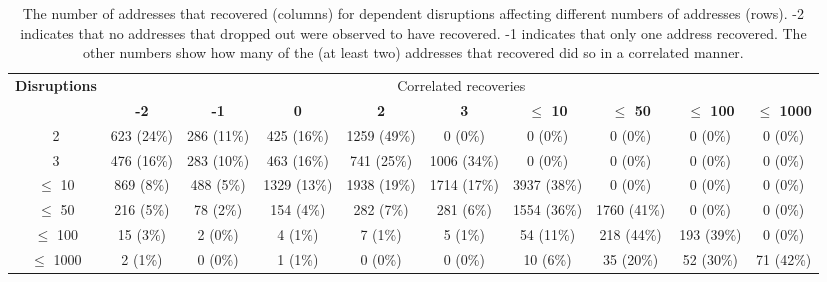\begin{table*}[th]
  \centering
  \hspace{-0.04in}\tiny
  \begin{tabular}{c|c|c|c|c|c|c|c|c|c|}
\textbf{Disruptions} & \multicolumn{9}{c|}{Correlated recoveries} \\
    & \textbf{-2} & \textbf{-1} & \textbf{0} & \textbf{2} &
    \textbf{3} & \textbf{$\leq$ 10}  &
    \textbf{$\leq$ 50}  & \textbf{$\leq$ 100}  & \textbf{$\leq$ 1000}\\
    \hline
2 & 623 (24\%) & 286 (11\%) & 425 (16\%) & 1259 (49\%) & 0 (0\%) & 0 (0\%) & 0 (0\%) & 0 (0\%) & 0 (0\%)\\
3 & 476 (16\%) & 283 (10\%) & 463 (16\%) & 741 (25\%) & 1006 (34\%) & 0 (0\%) & 0 (0\%) & 0 (0\%) & 0 (0\%)\\
$\leq$ 10 & 869 (8\%) & 488 (5\%) & 1329 (13\%) & 1938 (19\%) & 1714 (17\%) & 3937 (38\%) & 0 (0\%) & 0 (0\%) & 0 (0\%)\\
$\leq$ 50 & 216 (5\%) & 78 (2\%) & 154 (4\%) & 282 (7\%) & 281 (6\%) & 1554 (36\%) & 1760 (41\%) & 0 (0\%) & 0 (0\%)\\
$\leq$ 100 & 15 (3\%) & 2 (0\%) & 4 (1\%) & 7 (1\%) & 5 (1\%) & 54 (11\%) & 218 (44\%) & 193 (39\%) & 0 (0\%)\\
$\leq$ 1000 & 2 (1\%) & 0 (0\%) & 1 (1\%) & 0 (0\%) & 0 (0\%) & 10 (6\%) & 35 (20\%) & 52 (30\%) & 71 (42\%)\\
    \end{tabular}
  \caption[Dependent recovery]{\label{tbl:nouts_vs_nrecs} The number of addresses that
    recovered (columns) for dependent disruptions affecting different numbers of
    addresses (rows). -2 indicates that no addresses that dropped out
    were observed to have recovered. -1 indicates that only one address recovered. The other
    numbers show how many of the (at least two) addresses that
    recovered did so in a correlated manner.
  }
\end{table*}

